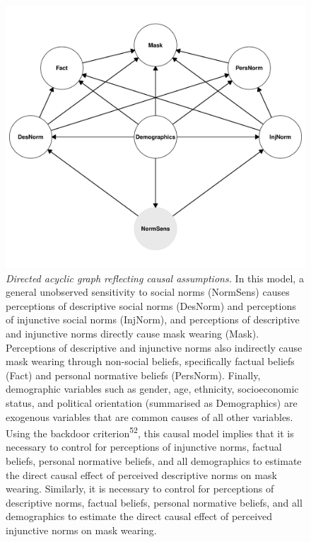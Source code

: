 \documentclass[
  man, donotrepeattitle,floatsintext]{apa6}
\begin{document}
\newpage



\begin{figure}
\centering
\includegraphics{manuscript_files/figure-latex/plotDAG-1.pdf}
\caption{\label{fig:plotDAG}\emph{Directed acyclic graph reflecting causal assumptions.} In this model, a general unobserved sensitivity to social norms (NormSens) causes perceptions of descriptive social norms (DesNorm) and perceptions of injunctive social norms (InjNorm), and perceptions of descriptive and injunctive norms directly cause mask wearing (Mask). Perceptions of descriptive and injunctive norms also indirectly cause mask wearing through non-social beliefs, specifically factual beliefs (Fact) and personal normative beliefs (PersNorm). Finally, demographic variables such as gender, age, ethnicity, socioeconomic status, and political orientation (summarised as Demographics) are exogenous variables that are common causes of all other variables. Using the backdoor criterion\textsuperscript{52}, this causal model implies that it is necessary to control for perceptions of injunctive norms, factual beliefs, personal normative beliefs, and all demographics to estimate the direct causal effect of perceived descriptive norms on mask wearing. Similarly, it is necessary to control for perceptions of descriptive norms, factual beliefs, personal normative beliefs, and all demographics to estimate the direct causal effect of perceived injunctive norms on mask wearing.}
\end{figure}
\end{document}
